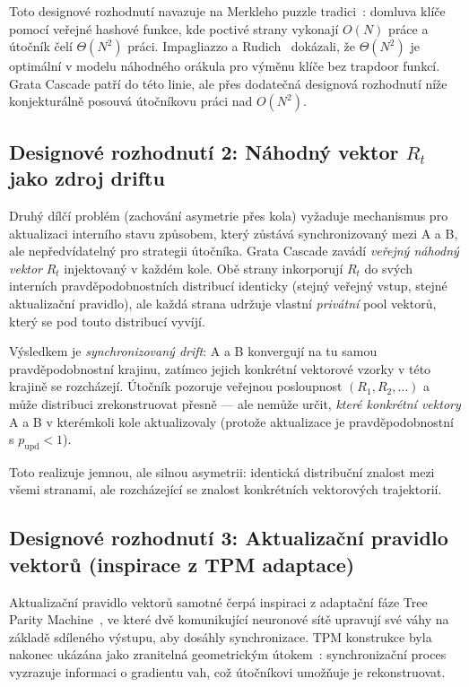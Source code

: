\documentclass[11pt,a4paper]{article}
\begin{document}
Toto designové rozhodnutí navazuje na Merkleho puzzle tradici~\cite{Merkle1978}: domluva klíče pomocí veřejné hashové funkce, kde poctivé strany vykonají $O(N)$ práce a útočník čelí $\Theta(N^2)$ práci. Impagliazzo a Rudich~\cite{IR1989} dokázali, že $\Theta(N^2)$ je optimální v modelu náhodného orákula pro výměnu klíče bez trapdoor funkcí. Grata Cascade patří do této linie, ale přes dodatečná designová rozhodnutí níže konjekturálně posouvá útočníkovu práci nad $O(N^2)$.

\subsection{Designové rozhodnutí 2: Náhodný vektor $R_t$ jako zdroj driftu}

Druhý dílčí problém (zachování asymetrie přes kola) vyžaduje mechanismus pro aktualizaci interního stavu způsobem, který zůstává synchronizovaný mezi A a B, ale nepředvídatelný pro strategii útočníka. Grata Cascade zavádí \emph{veřejný náhodný vektor} $R_t$ injektovaný v každém kole. Obě strany inkorporují $R_t$ do svých interních pravděpodobnostních distribucí identicky (stejný veřejný vstup, stejné aktualizační pravidlo), ale každá strana udržuje vlastní \emph{privátní} pool vektorů, který se pod touto distribucí vyvíjí.

Výsledkem je \emph{synchronizovaný drift}: A a B konvergují na tu samou pravděpodobnostní krajinu, zatímco jejich konkrétní vektorové vzorky v této krajině se rozcházejí. Útočník pozoruje veřejnou posloupnost $(R_1, R_2, \ldots)$ a může distribuci zrekonstruovat přesně --- ale nemůže určit, \emph{které konkrétní vektory} A a B v kterémkoli kole aktualizovaly (protože aktualizace je pravděpodobnostní s $p_\text{upd} < 1$).

Toto realizuje jemnou, ale silnou asymetrii: identická distribuční znalost mezi všemi stranami, ale rozcházející se znalost konkrétních vektorových trajektorií.

\subsection{Designové rozhodnutí 3: Aktualizační pravidlo vektorů (inspirace z TPM adaptace)}

Aktualizační pravidlo vektorů samotné čerpá inspiraci z adaptační fáze Tree Parity Machine~\cite{KKK2002}, ve které dvě komunikující neuronové sítě upravují své váhy na základě sdíleného výstupu, aby dosáhly synchronizace. TPM konstrukce byla nakonec ukázána jako zranitelná geometrickým útokem~\cite{KMS2003}: synchronizační proces vyzrazuje informaci o gradientu vah, což útočníkovi umožňuje je rekonstruovat.
\end{document}
